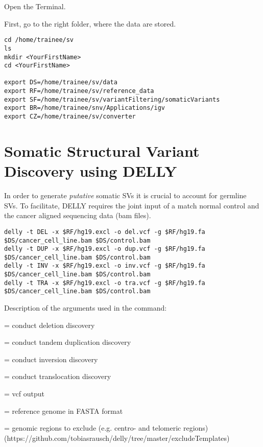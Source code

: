 \begin{steps}
Open the Terminal.

First, go to the right folder, where the data are stored.
\begin{lstlisting}
cd /home/trainee/sv
ls
mkdir <YourFirstName>
cd <YourFirstName>

export DS=/home/trainee/sv/data
export RF=/home/trainee/sv/reference_data
export SF=/home/trainee/sv/variantFiltering/somaticVariants
export BR=/home/trainee/snv/Applications/igv
export CZ=/home/trainee/sv/converter

\end{lstlisting}

\end{steps}

\section{Somatic Structural Variant Discovery using DELLY}

\begin{information}
In order to generate \emph{putative} somatic SVs it is crucial to account for germline SVs. To facilitate, DELLY requires the joint input of a match normal control and the cancer aligned sequencing data (bam files).
\end{information}

\begin{lstlisting}
delly -t DEL -x $RF/hg19.excl -o del.vcf -g $RF/hg19.fa $DS/cancer_cell_line.bam $DS/control.bam
delly -t DUP -x $RF/hg19.excl -o dup.vcf -g $RF/hg19.fa $DS/cancer_cell_line.bam $DS/control.bam
delly -t INV -x $RF/hg19.excl -o inv.vcf -g $RF/hg19.fa $DS/cancer_cell_line.bam $DS/control.bam
delly -t TRA -x $RF/hg19.excl -o tra.vcf -g $RF/hg19.fa $DS/cancer_cell_line.bam $DS/control.bam

\end{lstlisting}


Description of the arguments used in the command: 
\begin{description}[style=multiline,labelindent=0cm,align=right,leftmargin=\descriptionlabelspace,rightmargin=1.5cm,font=\ttfamily]
  \item[DEL] = conduct deletion discovery
  \item[DUP] = conduct tandem duplication discovery
  \item[INV] = conduct inversion discovery 
  \item[TRA] = conduct translocation discovery
  \item[-o] = vcf output
  \item[-g] = reference genome in FASTA format
  \item[-x] = genomic regions to exclude (e.g. centro- and telomeric regions) (https://github.com/tobiasrausch/delly/tree/master/excludeTemplates)
\end{description}


